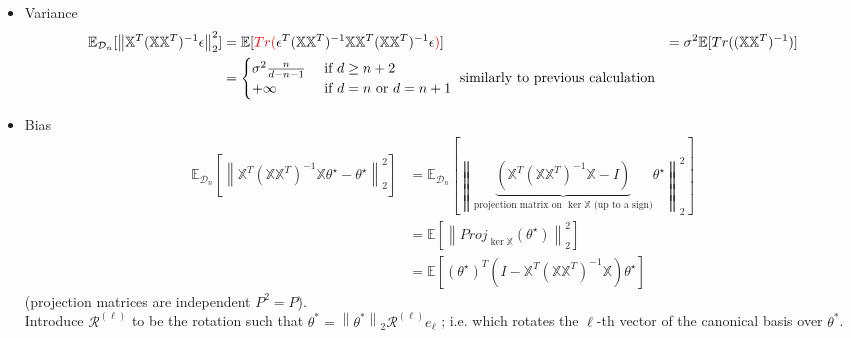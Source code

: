 \begin{itemize}
    \item Variance 
    \begin{align*}
        \mathbb{E}_{\mathcal{D}_n} [ \left\| \mathbb{X}^T (\mathbb{X} \mathbb{X}^T)^{-1} \epsilon  \right\| _2 ^2 ] 
            &= \mathbb{E}[ \textcolor{red}{Tr(} \epsilon ^T (\mathbb{X} \mathbb{X}^T )^{-1} \mathbb{X} \mathbb{X}^T (\mathbb{X} \mathbb{X}^T)^{-1} \epsilon \textcolor{red}{)} ]
            &= \sigma ^2 \mathbb{E}[ Tr ((\mathbb{X} \mathbb{X}^T)^{-1})] \\
            &= \begin{cases}
                \sigma ^2 \frac{n}{d - n - 1} &\text{ if } d \geq n+2 \\
                +\infty &\text{ if } d = n \text{ or } d = n+1\\
            \end{cases} \text{ similarly to previous calculation}
    \end{align*}
    \item Bias
    \begin{align*}
        \mathbb{E}_{\mathcal{D}_n} [ \left\| \mathbb{X}^T (\mathbb{X} \mathbb{X}^T)^{-1} \mathbb{X} \theta ^\star - \theta ^\star  \right\| _2 ^2 ]
            &= \mathbb{E}_{\mathcal{D}_n} [ \left\| \underbrace{(\mathbb{X}^T (\mathbb{X} \mathbb{X}^T)^{-1} \mathbb{X} - I)}_{\text{projection matrix on } \ker \mathbb{X} \text{ (up to a sign)}} \theta ^\star  \right\| _2 ^2 ] \\
            &= \mathbb{E} [ \left\| Proj _{\ker \mathbb{X}} (\theta ^\star ) \right\| _2 ^2 ] \\
            &= \mathbb{E}[(\theta ^\star )^T(I - \mathbb{X}^T(\mathbb{X}\mathbb{X}^T)^{-1} \mathbb{X}) \theta ^\star ]
    \end{align*}
    (projection matrices are independent $P^2 = P$). \\
    Introduce $\mathcal{R}^{(\ell )}$ to be the rotation such that $\theta ^\ast = \left\| \theta ^\ast  \right\|_2 \mathcal{R}^{(\ell )} e_\ell$ ; i.e. which rotates the $\ell $-th vector of the canonical basis over $\theta ^\ast $.


\end{itemize}
